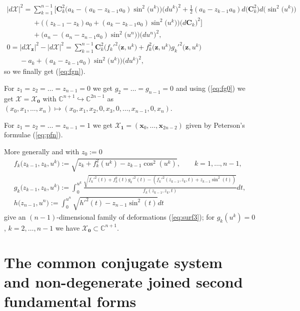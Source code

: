 \documentclass[pdftex]{sigma}
\begin{document}
\begin{gather*}
|d\mathcal{X}|^2=\sum_{k=1}^{n-1}\big[\mathbf{C}_k^2\big(a_k-
(a_k-z_{k-1}a_0)\sin^2\big(u^k\big)\big)\big(du^k\big)^2
+\tfrac{1}{2}(a_k-z_{k-1}a_0)d\big(\mathbf{C}_k^2\big)d\big(\sin^2\big(u^k\big)\big)
\\
\phantom{|d\mathcal{X}|^2=}{}
+\big((z_{k-1}-z_k)a_0+
(a_k-z_{k-1}a_0)\sin^2\big(u^k\big)\big)\big(d\mathbf{C}_k\big)^2\big]\\
\phantom{|d\mathcal{X}|^2=}{}
+\big(a_n-(a_n-z_{n-1}a_0)\sin^2\big(u^n\big)\big)\big(du^n\big)^2,
\\
0=|d\mathcal{X}_{\mathbf{z}}|^2-|d\mathcal{X}|^2=
\sum_{k=1}^{n-1}\mathbf{C}_k^2\big(f_k'^2\big(\mathbf{z},u^k\big)
+f_k^2\big(\mathbf{z},u^k\big)g_k'^2\big(\mathbf{z},u^k\big)\\
\phantom{0=}{}-a_k+
(a_k-z_{k-1}a_0)\sin^2\big(u^k\big)\big)\big(du^k\big)^2,
\end{gather*}
so we f\/inally get (\ref{eq:fgn}).

For $z_1=z_2=\dots =z_{n-1}=0$ we get $g_2=\dots =g_{n-1}=0$ and using
(\ref{eq:fg0}) we get $\mathcal{X}=\mathcal{X}_{\mathbf{0}}$ with
$\mathbb{C}^{n+1}\hookrightarrow\mathbb{C}^{2n-1}$ as
$(x_0,x_1,\dots ,x_n)\mapsto(x_0,x_1,x_2,0,x_3,0,\dots ,x_{n-1},0,x_n)$.

For $z_1=z_2=\dots =z_{n-1}=1$ we get
$\mathcal{X}_{\mathbf{1}}=(\mathbf{x}_0,\dots ,\mathbf{x}_{2n-2})$
given by Peterson's formulae (\ref{eq:pfn}).

More generally and with $z_0:=0$
\begin{gather}
f_k\big(z_{k-1},z_k,u^k\big):=\sqrt{z_k+f_k^2(u^k)-z_{k-1}\cos^2(u^k)},\qquad k=1,\dots ,n-1,\nonumber\\
g_k\big(z_{k-1},z_k,u^k\big):=\int_0^{u^k}\frac{\sqrt{f_k'^2(t)+f_k^2(t)g_k'^2(t)-
(f_k'^2(z_{k-1},z_k,t)+z_{k-1}\sin^2(t))}}
{f_k(z_{k-1},z_k,t)}dt,\nonumber\\
h\big(z_{n-1},u^n\big):=\int_0^{u^n}\sqrt{h'^2(t)-z_{n-1}\sin^2(t)}dt \label{eq:fgr}
\end{gather}
give an $(n-1)$-dimensional family of deformations
(\ref{eq:surf3}); for $g_k(u^k)=0$, $k=2,\dots ,n-1$ we have
$\mathcal{X}_{\mathbf{0}}\subset\mathbb{C}^{n+1}$.

\section{The common conjugate system\\ and non-degenerate joined second fundamental forms}\label{sec:pet2}
\end{document}
